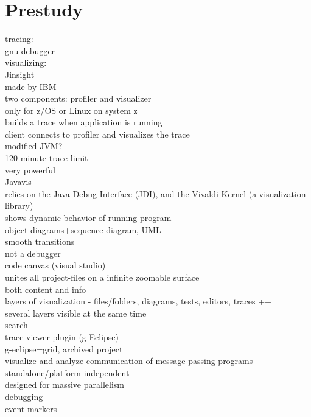 \section{Prestudy}\label{Prestudy}

tracing:\\
gnu debugger\\

visualizing:\\


Jinsight\\
	made by IBM\\
	two components: profiler and visualizer\\
	only for z/OS or Linux on system z\\
	builds a trace when application is running\\
	client connects to profiler and visualizes the trace\\
	modified JVM?\\
	120 minute trace limit\\
	very powerful\\

Javavis\\
	relies on the Java Debug Interface (JDI), and the Vivaldi Kernel (a visualization library)\\
	shows dynamic behavior of running program\\
	object diagrams+sequence diagram, UML\\
	smooth transitions\\
	not a debugger\\
	
code canvas (visual studio)\\
	unites all project-files on a infinite zoomable surface\\
	both content and info\\
	layers of visualization - files/folders, diagrams, tests, editors, traces ++\\
	several layers visible at the same time\\
	search\\

trace viewer plugin (g-Eclipse)\\
	g-eclipse=grid, archived project\\
	visualize and analyze communication of message-passing programs\\
	standalone/platform independent\\
	designed for massive parallelism\\
	debugging\\
	event markers\\

